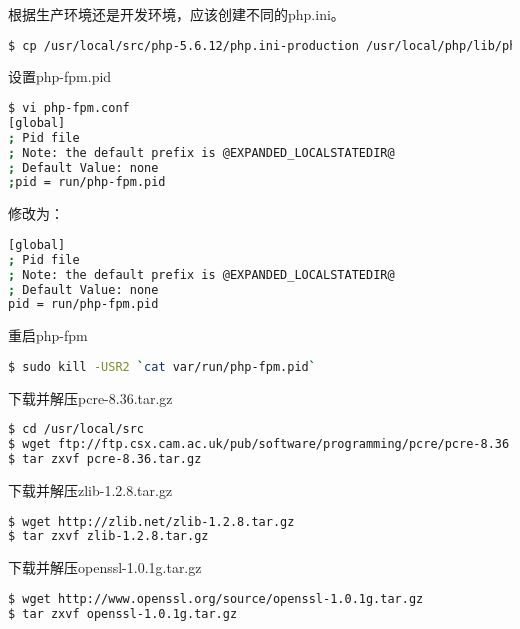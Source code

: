 \begin{lstlisting}[language=bash]

\end{lstlisting}






根据生产环境还是开发环境，应该创建不同的php.ini。

\begin{lstlisting}[language=bash]
$ cp /usr/local/src/php-5.6.12/php.ini-production /usr/local/php/lib/php.ini
\end{lstlisting}

设置php-fpm.pid

\begin{lstlisting}[language=bash]
$ vi php-fpm.conf
[global]
; Pid file
; Note: the default prefix is @EXPANDED_LOCALSTATEDIR@
; Default Value: none
;pid = run/php-fpm.pid
\end{lstlisting}

修改为：

\begin{lstlisting}[language=bash]
[global]
; Pid file
; Note: the default prefix is @EXPANDED_LOCALSTATEDIR@
; Default Value: none
pid = run/php-fpm.pid
\end{lstlisting}

重启php-fpm


\begin{lstlisting}[language=bash]
$ sudo kill -USR2 `cat var/run/php-fpm.pid`
\end{lstlisting}



下载并解压pcre-8.36.tar.gz

\begin{lstlisting}[language=bash]
$ cd /usr/local/src
$ wget ftp://ftp.csx.cam.ac.uk/pub/software/programming/pcre/pcre-8.36.tar.gz
$ tar zxvf pcre-8.36.tar.gz
\end{lstlisting}


下载并解压zlib-1.2.8.tar.gz


\begin{lstlisting}[language=bash]
$ wget http://zlib.net/zlib-1.2.8.tar.gz
$ tar zxvf zlib-1.2.8.tar.gz
\end{lstlisting}

下载并解压openssl-1.0.1g.tar.gz


\begin{lstlisting}[language=bash]
$ wget http://www.openssl.org/source/openssl-1.0.1g.tar.gz
$ tar zxvf openssl-1.0.1g.tar.gz
\end{lstlisting}

